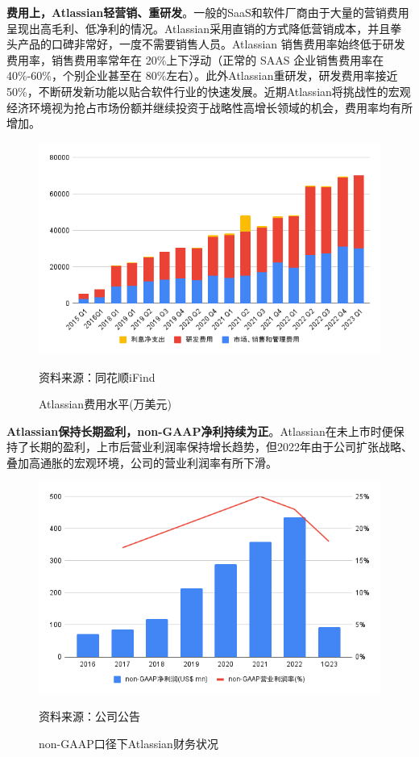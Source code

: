 \textbf{费用上，Atlassian轻营销、重研发}。一般的SaaS和软件厂商由于大量的营销费用呈现出高毛利、低净利的情况。Atlassian采用直销的方式降低营销成本，并且拳头产品的口碑非常好，一度不需要销售人员。Atlassian 销售费用率始终低于研发费用率，销售费用率常年在 20\%上下浮动（正常的 SAAS 企业销售费用率在40\%-60\%，个别企业甚至在 80\%左右）。此外Atlassian重研发，研发费用率接近50\%，不断研发新功能以贴合软件行业的快速发展。近期Atlassian将挑战性的宏观经济环境视为抢占市场份额并继续投资于战略性高增长领域的机会，费用率均有所增加。

\begin{figure}[H]
    \caption{Atlassian费用水平(万美元)}
    \begin{center}
        \includegraphics[width=0.8\linewidth]{img/cost.png}
    \end{center}
    \footnotesize{资料来源：同花顺iFind}
\end{figure}

\textbf{Atlassian保持长期盈利，non-GAAP净利持续为正}。Atlassian在未上市时便保持了长期的盈利，上市后营业利润率保持增长趋势，但2022年由于公司扩张战略、叠加高通胀的宏观环境，公司的营业利润率有所下滑。
\begin{figure}[H]
    \caption{non-GAAP口径下Atlassian财务状况}
    \begin{center}
        \includegraphics[width=0.7\linewidth]{img/non-GAAP.png}
    \end{center}
    \footnotesize{资料来源：公司公告}
\end{figure}

